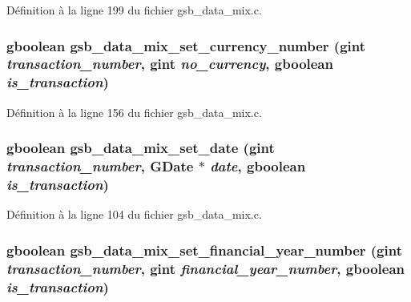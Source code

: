 Définition à la ligne 199 du fichier gsb\_\-data\_\-mix.c.

\subsubsection[{gsb\_\-data\_\-mix\_\-set\_\-currency\_\-number}]{\setlength{\rightskip}{0pt plus 5cm}gboolean gsb\_\-data\_\-mix\_\-set\_\-currency\_\-number (gint {\em transaction\_\-number}, \/  gint {\em no\_\-currency}, \/  gboolean {\em is\_\-transaction})}\label{gsb__data__mix_8c_af48fe57865c39cceaf3199f4b24dae12}


Définition à la ligne 156 du fichier gsb\_\-data\_\-mix.c.

\subsubsection[{gsb\_\-data\_\-mix\_\-set\_\-date}]{\setlength{\rightskip}{0pt plus 5cm}gboolean gsb\_\-data\_\-mix\_\-set\_\-date (gint {\em transaction\_\-number}, \/  GDate $\ast$ {\em date}, \/  gboolean {\em is\_\-transaction})}\label{gsb__data__mix_8c_a57c125cb2e58f59ed3b7ee5148eca14c}


Définition à la ligne 104 du fichier gsb\_\-data\_\-mix.c.

\subsubsection[{gsb\_\-data\_\-mix\_\-set\_\-financial\_\-year\_\-number}]{\setlength{\rightskip}{0pt plus 5cm}gboolean gsb\_\-data\_\-mix\_\-set\_\-financial\_\-year\_\-number (gint {\em transaction\_\-number}, \/  gint {\em financial\_\-year\_\-number}, \/  gboolean {\em is\_\-transaction})}\label{gsb__data__mix_8c_a8530f9bcbd47edb4c920160f1e8d4594}



